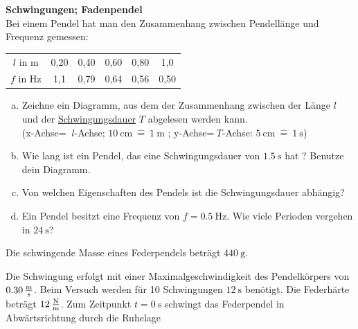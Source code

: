 \documentclass[a4paper]{article}
\begin{document}
\begin{enumerate}[1.]

\item {\bf Schwingungen; Fadenpendel}\\
Bei einem Pendel hat man den Zusammenhang zwischen Pendellänge und Frequenz gemessen:

\begin{tabular}{cccccc}
$l$ in m & 0,20 & 0,40 & 0,60 & 0,80 & 1,0 \\
$f$ in Hz & 1,1 & 0,79 & 0,64 & 0,56 & 0,50  
\end{tabular}

\begin{enumerate}[a)]
\item Zeichne ein Diagramm, aus dem der Zusammenhang zwischen der Länge $l$ und der \underline{Schwingungsdauer} $T$ abgelesen werden kann.\\
(x-Achse= $ ~ l $-Achse;  $\SI{10}{\centi\meter}~\hat{=}~\SI{1}{\meter}$ ;
 y-Achse=$ ~T$-Achse: $\SI{5}{\centi\meter}~\hat{=}~\SI{1}{\second}$)
\item Wie lang ist ein Pendel, das eine Schwingungsdauer von $\SI{1,5}{\second}$ hat ? Benutze dein Diagramm.
\item Von welchen Eigenschaften des Pendels ist die Schwingungsdauer abhängig?
\item Ein Pendel besitzt eine Frequenz von $f=\SI{0,5}{\hertz}$. Wie viele Perioden vergehen in $\SI{24}{\second}$? 
\end{enumerate}


{\bf \item Die schwingende Masse eines Federpendels beträgt $\SI{440}{\gram}$.} Die Schwingung erfolgt mit einer Maximalgeschwindigkeit des Pendelkörpers von $\SI{0,30}{\meter\over\second}$. Beim Versuch werden für 10 Schwingungen $\SI{12}{\second}$ benötigt. Die Federhärte beträgt $\SI{12}{\newton\over\meter}$. Zum Zeitpunkt $t = \SI{0}{\second}$ schwingt das Federpendel in Abwärts\-richtung durch die Ruhelage 


\end{enumerate}
\end{document}
